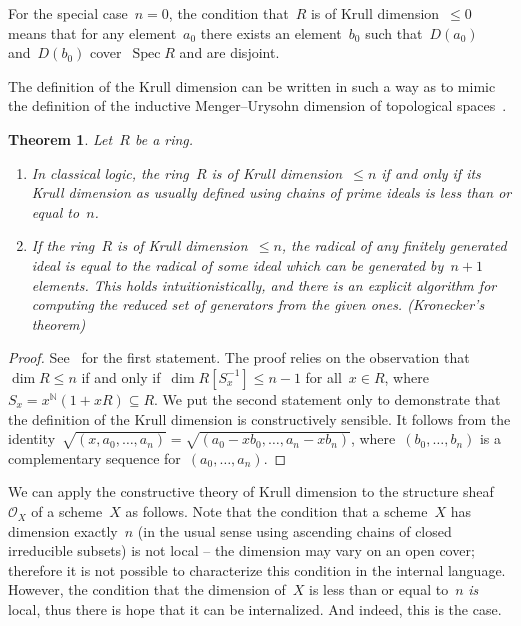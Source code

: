 \documentclass[10pt]{amsart}
\theoremstyle{definition}
\theoremstyle{plain}
\newtheorem{thm}[defn]{Theorem}
\theoremstyle{remark}
\renewcommand{\O}{\mathcal{O}}
\newcommand{\NN}{\mathbb{N}}
\DeclareMathOperator{\Spec}{Spec}
\newcommand{\?}{\,{:}\,}
\renewcommand{\_}{\mathpunct{.}\,}
\begin{document}
For the special case~$n = 0$, the condition that~$R$ is of Krull
dimension~$\leq 0$ means that for any element~$a_0$ there exists an
element~$b_0$ such that~$D(a_0)$ and~$D(b_0)$ cover~$\Spec R$ and are disjoint.

The definition of the Krull dimension can be written in such a way as to mimic the
definition of the inductive Menger--Urysohn dimension of topological
spaces~\cite[Section~1]{dyn:krull-integral}.

\begin{thm}Let~$R$ be a ring.
\begin{enumerate}
\item In classical logic, the ring~$R$ is
of Krull dimension~$\leq n$ if and only if its Krull dimension
as usually defined using chains of prime ideals is less than or equal to~$n$.
\item If the ring~$R$ is
of Krull dimension~$\leq n$, the radical of any finitely generated ideal is
equal to the radical of some ideal which can be generated by~$n+1$ elements.
This holds intuitionistically, and there is an explicit algorithm for computing
the reduced set of generators from the given ones. (Kronecker's theorem)
\end{enumerate}
\end{thm}
\begin{proof}See~\cite[Theorem~1.2]{dyn:krull-integral} for the first
statement. The proof relies on the observation that~$\dim R \leq n$ if and only
if~$\dim R[S_x^{-1}] \leq n-1$ for all~$x \in R$, where~$S_x = x^\NN (1+xR)
\subseteq R$. We put the second statement only to demonstrate that the
definition of the Krull dimension is constructively sensible. It follows from
the identity~$\sqrt{(x,a_0,\ldots,a_n)} =
\sqrt{(a_0-xb_0,\ldots,a_n-xb_n)}$, where~$(b_0,\ldots,b_n)$ is a complementary
sequence for~$(a_0,\ldots,a_n)$.
\end{proof}

We can apply the constructive theory of Krull dimension to the structure
sheaf~$\O_X$ of a scheme~$X$ as follows. Note that the condition that a
scheme~$X$ has dimension exactly~$n$ (in the usual sense using ascending chains
of closed irreducible subsets) is not local -- the dimension may vary on
an open cover; therefore it is not possible to characterize this condition in
the internal language. However, the condition that the dimension of~$X$ is less
than or equal to~$n$ \emph{is} local, thus there is hope that it can be
internalized. And indeed, this is the case.
\end{document}
